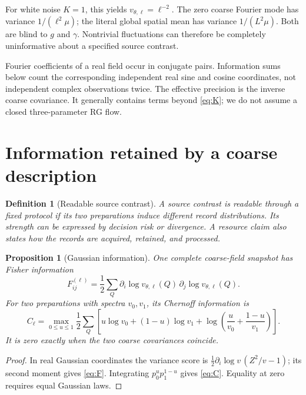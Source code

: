 \documentclass[12pt,a4paper]{article}
\newtheorem{proposition}[theorem]{Proposition}
\newtheorem{definition}[theorem]{Definition}
\begin{document}
For white noise $K=1$, this yields $v_{\theta,\ell}=\ell^{-2}$.
The zero coarse Fourier mode has variance $1/(\ell^2\mu)$; the literal
global spatial mean has variance $1/(L^2\mu)$. Both are blind to $g$
and $\gamma$. Nontrivial fluctuations can therefore be completely
uninformative about a specified source contrast.

Fourier coefficients of a real field occur in conjugate pairs.
Information sums below count the corresponding independent real sine
and cosine coordinates, not independent complex observations twice.
The effective precision is the inverse coarse covariance. It generally
contains terms beyond \eqref{eq:K}; we do not assume a closed
three-parameter RG flow.

\section{Information retained by a coarse description}

\begin{definition}[Readable source contrast]
A source contrast is readable through a fixed protocol if its two
preparations induce different record distributions. Its strength can be
expressed by decision risk or divergence. A resource claim also states
how the records are acquired, retained, and processed.
\end{definition}

\begin{proposition}[Gaussian information]\label{prop:information}
One complete coarse-field snapshot has Fisher information
\begin{equation}
 F_{ij}^{(\ell)}=\frac12\sum_Q
 \partial_i\log v_{\theta,\ell}(Q)\,
 \partial_j\log v_{\theta,\ell}(Q).
 \label{eq:F}
\end{equation}
For two preparations with spectra $v_0,v_1$, its Chernoff information is
\begin{equation}
 C_\ell=\max_{0\leq u\leq1}\frac12\sum_Q
 \left[u\log v_0+(1-u)\log v_1+
 \log\left(\frac{u}{v_0}+\frac{1-u}{v_1}\right)\right].
 \label{eq:C}
\end{equation}
It is zero exactly when the two coarse covariances coincide.
\end{proposition}
\begin{proof}
In real Gaussian coordinates the variance score is
$\frac12\partial_i\log v\,(Z^2/v-1)$; its second moment gives
\eqref{eq:F}. Integrating $p_0^u p_1^{1-u}$ gives \eqref{eq:C}.
Equality at zero requires equal Gaussian laws.
\end{proof}
\end{document}

